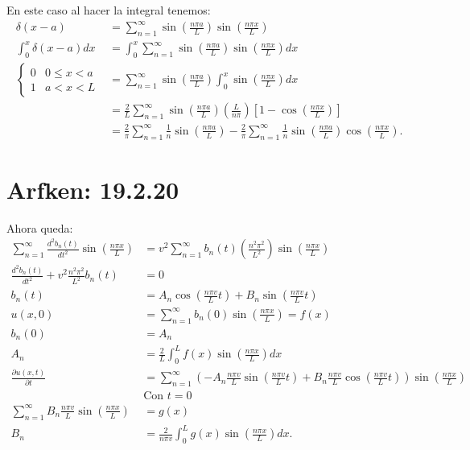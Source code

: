 \documentclass{report}
\begin{document}
En este caso al hacer la integral tenemos:
\begin{align*}
  \delta \left( x - a \right)  &= \sum_{n=1}^{\infty} \sin\left( \frac{n\pi a}{L} \right) \sin\left( \frac{n \pi x}{L} \right) \\
  \int_{0}^{x} \delta\left( x - a \right) dx &= \int_{0}^{x} \sum_{n=1}^{\infty} \sin\left( \frac{n\pi a}{L} \right) \sin\left( \frac{n \pi x}{L} \right) dx\\
  \begin{cases}
   0& 0 \le  x < a\\
   1& a < x < L
  \end{cases} &= \sum_{n=1}^{\infty} \sin\left( \frac{n\pi a}{L} \right) \int_{0}^{x} \sin\left( \frac{n\pi x}{L} \right)dx   \\
  &= \frac{2}{L}\sum_{n=1}^{\infty} \sin\left( \frac{n\pi a}{L} \right) \left( \frac{L}{n\pi} \right) \left[ 1 - \cos\left( \frac{n\pi x}{L} \right)  \right]  \\
  &= \frac{2}{\pi}\sum_{n=1}^{\infty} \frac{1}{n}\sin\left( \frac{n\pi a}{L} \right) - \frac{2}{\pi}\sum_{n=1}^{\infty}\frac{1}{n} \sin\left( \frac{n\pi a}{L} \right) \cos\left( \frac{n \pi x}{L} \right)
.\end{align*}

\chapter{Arfken: 19.2.20}

Ahora queda:
\begin{align*}
  \sum_{n=1}^{\infty} \frac{d^2 b_n\left( t \right) }{dt^2} \sin\left( \frac{n \pi x}{L} \right) &= v^2 \sum_{n=1}^{\infty} b_n\left( t \right) \left( \frac{n^2\pi^2}{L^2} \right) \sin\left( \frac{n\pi x}{L} \right) \\
  \frac{d^2 b_n\left( t \right) }{dt^2} + v^2 \frac{n^2\pi^2}{L^2}b_n\left( t \right) &= 0 \\
  b_n\left( t \right) &= A_n \cos\left( \frac{n\pi v}{L}t \right) + B_n \sin\left( \frac{n\pi v}{L}t \right)  \\
  u\left( x, 0 \right) &= \sum_{n=1}^{\infty} b_n\left( 0 \right) \sin\left( \frac{n\pi x}{L} \right) = f\left( x \right)  \\
  b_n\left( 0 \right) &= A_n \\
  A_n &= \frac{2}{L}\int_{0}^{L} f\left( x \right) \sin\left( \frac{n\pi x}{L} \right) dx \\
  \frac{\partial u\left( x, t \right) }{\partial t} &= \sum_{n=1}^{\infty} \left( -A_n \frac{n\pi v}{L}\sin\left( \frac{n \pi v}{L} t \right) + B_n \frac{n\pi v}{L}\cos\left( \frac{n\pi v}{L}t \right)  \right)\sin\left( \frac{n \pi x}{L} \right) \\
  &\text{Con }t = 0 \\
  \sum_{n=1}^{\infty} B_n \frac{n \pi v}{L}\sin\left( \frac{n \pi x}{L} \right) &= g\left( x \right)  \\
  B_n &= \frac{2}{n \pi v}\int_{0}^{L}g\left( x \right) \sin\left(\frac{n \pi x}{L} \right)dx
.\end{align*}
\end{document}
